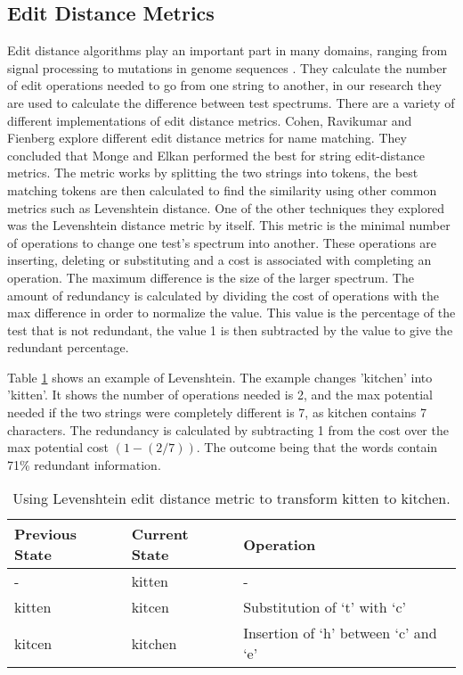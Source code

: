 \subsection{Edit Distance Metrics}
\label{editdistbg}
Edit distance algorithms play an important part in many domains, ranging from signal processing to mutations in genome sequences \cite{navarro2001guided}. They calculate the number of edit operations needed to go from one string to another, in our research they are used to calculate the difference between test spectrums. There are a variety of different implementations of edit distance metrics. Cohen, Ravikumar and Fienberg \cite{cohen2003comparison} explore different edit distance metrics for name matching. They concluded that Monge and Elkan \cite{monge1997efficient} performed the best for string edit-distance metrics. The metric works by splitting the two strings into tokens, the best matching tokens are then calculated to find the similarity using other common metrics such as Levenshtein distance. One of the other techniques they explored was the Levenshtein distance \cite{levenshtein1966binary} metric by itself. This metric is the minimal number of operations to change one test's spectrum into another. These operations are inserting, deleting or substituting and a cost is associated with completing an operation. The maximum difference is the size of the larger spectrum. The amount of redundancy is calculated by dividing the cost of operations with the max difference in order to normalize the value. This value is the percentage of the test that is not redundant, the value 1 is then subtracted by the value to give the redundant percentage.

Table \ref{levenTable} shows an example of Levenshtein. The example changes 'kitchen' into 'kitten'. It shows the number of operations needed is 2, and the max potential needed if the two strings were completely different is 7, as kitchen contains 7 characters. The redundancy is calculated by subtracting 1 from the cost over the max potential cost $(1 - (2/7)) $. The outcome being that the words contain 71\% redundant information. 

\begin{table}[H]
\centering

\begin{tabular}{|l|l|l|}
\hline
{\bf Previous State} & {\bf Current State} & {\bf Operation}                      \\ \hline
-                    & kitten              & -                                    \\ \hline
kitten               & kitcen              & Substitution of `t' with `c'         \\ \hline
kitcen               & kitchen             & Insertion of `h' between `c' and `e' \\ \hline
\end{tabular}
\caption{Using Levenshtein edit distance metric to transform kitten to kitchen.}
\label{levenTable}
\end{table}

